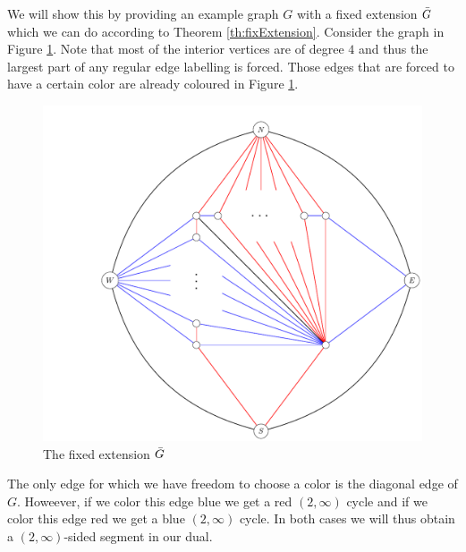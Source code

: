 We will show this by providing an example graph $G$ with a fixed extension $\bar{G}$ which we can do according to Theorem \ref{th:fixExtension}. Consider the graph in Figure \ref{fig:2manysidedLowerBound}. Note that most of the interior vertices are of degree $4$ and thus the largest part of any regular edge labelling is forced. Those edges that are forced to have a certain color are already coloured in Figure \ref{fig:2manysidedLowerBound}.


\begin{figure}[h!]
\centering
\includegraphics[scale=.5]{prelim/img/2manysidedLowerBound}

\caption{The fixed extension $\bar{G}$
    \label{fig:2manysidedLowerBound}}
\end{figure}

The only edge for which we have freedom to choose a color is the diagonal edge of $G$. Howeever, if we color this edge blue we get a red $(2, \infty)$ cycle and if we color this edge red we get a blue $(2, \infty)$ cycle. In both cases we will thus obtain a $(2,\infty)$-sided segment in our dual.

